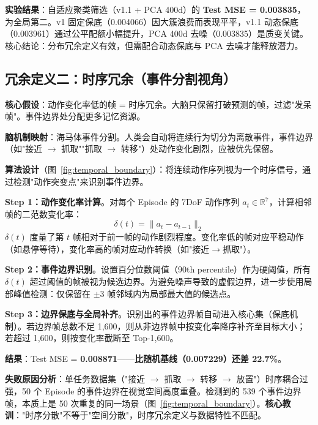 \documentclass[12pt,a4paper]{article}
\begin{document}
\textbf{实验结果}：自适应聚类筛选（v1.1 + PCA 400d）的 \textbf{Test MSE = 0.003835}，为全局第二。v1 固定保底（0.004066）因大簇浪费而表现平平，v1.1 动态保底（0.003961）通过公平配额小幅提升，PCA 400d 去噪（0.003835）是质变关键。核心结论：分布冗余定义有效，但需配合动态保底与 PCA 去噪才能释放潜力。

\subsection{冗余定义二：时序冗余（事件分割视角）}
\label{sec:event_segmentation}

\textbf{核心假设}：动作变化率低的帧 = 时序冗余。大脑只保留打破预测的帧，过滤"发呆帧"。事件边界处分配更多记忆资源。

\textbf{脑机制映射}：海马体事件分割。人类会自动将连续行为切分为离散事件，事件边界（如"接近 $\rightarrow$ 抓取""抓取 $\rightarrow$ 转移"）处动作变化剧烈，应被优先保留。

\textbf{算法设计}（图~\ref{fig:temporal_boundary}）：将连续动作序列视为一个时序信号，通过检测"动作突变点"来识别事件边界。

\textbf{Step 1：动作变化率计算}。对每个 Episode 的 7DoF 动作序列 $a_t \in \mathbb{R}^7$，计算相邻帧的二范数变化率：
\begin{equation}
    \delta(t) = \|a_t - a_{t-1}\|_2
\end{equation}
$\delta(t)$ 度量了第 $t$ 帧相对于前一帧的动作剧烈程度。变化率低的帧对应平稳动作（如悬停等待），变化率高的帧对应动作转换（如"接近$\rightarrow$抓取"）。

\textbf{Step 2：事件边界识别}。设置百分位数阈值（90th percentile）作为硬阈值，所有 $\delta(t)$ 超过阈值的帧被视为候选边界。为避免噪声导致的虚假边界，进一步使用局部峰值检测：仅保留在 $\pm 3$ 帧邻域内为局部最大值的候选点。

\textbf{Step 3：边界保底与全局补齐}。识别出的事件边界帧自动进入核心集（保底机制）。若边界帧总数不足 1,600，则从非边界帧中按变化率降序补齐至目标大小；若超过 1,600，则按变化率截断至 Top-1,600。

\textbf{结果}：Test MSE = \textbf{0.008871}——\textbf{比随机基线（0.007229）还差 22.7\%}。

\textbf{失败原因分析}：单任务数据集（"接近 $\rightarrow$ 抓取 $\rightarrow$ 转移 $\rightarrow$ 放置"）时序耦合过强，50 个 Episode 的事件边界在视觉空间高度重叠。检测到的 539 个事件边界帧，本质上是 50 次重复的同一场景（图~\ref{fig:temporal_boundary}）。\textbf{核心教训}："时序分散"不等于"空间分散"，时序冗余定义与数据特性不匹配。
\end{document}
